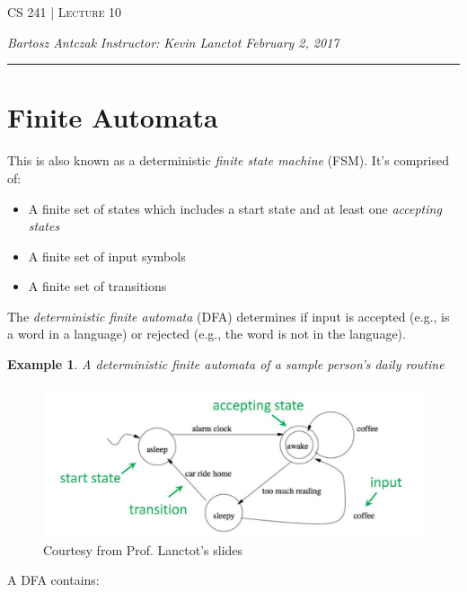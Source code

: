 \documentclass{report}
\newcommand{\lectureNum}{10}
\newcommand{\curDate}{February 2, 2017}
\newcommand{\course}{CS 241}
\newcommand{\instructor}{Kevin Lanctot}
\newtheorem{ex}{Example}[section]
\begin{document}
\begin{center}
\begin{Large}
\textsc{\course{} | Lecture \lectureNum{}}
\end{Large}
\end{center} 
\noindent \textit{Bartosz Antczak} \hfill
\textit{Instructor: \instructor{}} \hfill
\textit{\curDate{}}
\rule{\textwidth}{0.4pt}
\section{Finite Automata}
This is also known as a deterministic \textit{finite state machine} (FSM). It's comprised of:
\begin{itemize}
\item A finite set of states which includes a start state and at least one \textit{accepting states}
\item A finite set of input symbols
\item A finite set of transitions
\end{itemize}
The \textit{deterministic finite automata} (DFA) determines if input is accepted (e.g., is a word in a language) or rejected (e.g., the word is not in the language).
\begin{ex}
A deterministic finite automata of a sample person's daily routine
\end{ex}
\begin{figure}[ht]
\begin{center}
\includegraphics[scale=0.5]{fsm1.jpg}
\end{center}
\caption{Courtesy from Prof. Lanctot's slides}
\end{figure}
A DFA contains:
\end{document}
